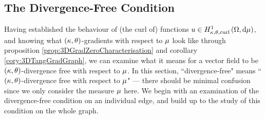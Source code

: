 \subsection{The Divergence-Free Condition} \label{apps:DivFreeEdge}
Having established the behaviour of (the curl of) functions $u\in H^1_{\kappa,\theta,\mathrm{curl}}\left( \Omega, \mathrm{d}\mu \right)$, and knowing what $\left( \kappa, \theta \right)$-gradients with respect to $\mu$ look like through proposition \ref{prop:3DGradZeroCharacterisation} and corollary \ref{cory:3DTangGradGraph}, we can examine what it means for a vector field to be $\left( \kappa, \theta \right)$-divergence free with respect to $\mu$.
In this section, ``divergence-free" means ``$\left( \kappa, \theta \right)$-divergence free with respect to $\mu$" --- there should be minimal confusion since we only consider the measure $\mu$ here.
We begin with an examination of the divergence-free condition on an individual edge, and build up to the study of this condition on the whole graph.

